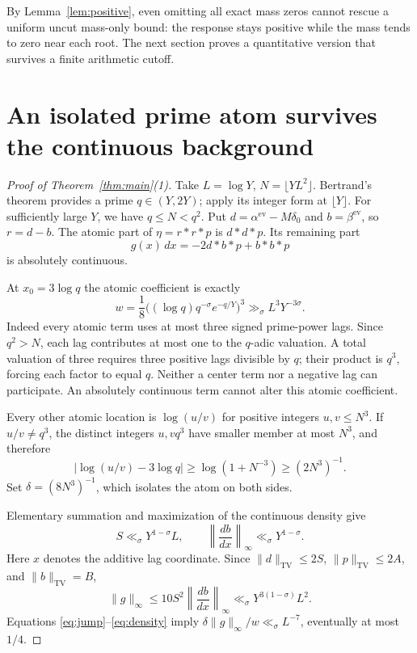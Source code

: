 \documentclass[11pt,a4paper]{article}
\theoremstyle{definition}
\theoremstyle{remark}
\newcommand{\TV}{\mathrm{TV}}
\newcommand{\ev}{\mathrm{ev}}
\newcommand{\dd}{\,d}
\begin{document}
By Lemma~\ref{lem:positive}, even omitting all exact mass zeros cannot
rescue a uniform uncut mass-only bound: the response stays positive
while the mass tends to zero near each root.
The next section proves a quantitative version that survives a
finite arithmetic cutoff.

\section{An isolated prime atom survives the continuous background}

\begin{proof}[Proof of Theorem~\ref{thm:main}(1)]
Take \(L=\log Y\), \(N=\lfloor YL^2\rfloor\).
Bertrand's theorem \cite{Erdos} provides a prime \(q\in(Y,2Y)\);
apply its integer form at \(\lfloor Y\rfloor\).
For sufficiently large \(Y\), we have \(q\le N<q^2\).
Put \(d=\alpha^\ev-M\delta_0\) and \(b=\beta^\ev\), so \(r=d-b\).
The atomic part of \(\eta=r*r*p\) is \(d*d*p\). Its remaining part
\[
 g(x)\dd x=-2d*b*p+b*b*p
\]
is absolutely continuous.

At \(x_0=3\log q\) the atomic coefficient is exactly
\begin{equation}
 w=\frac18\bigl((\log q)q^{-\sigma}e^{-q/Y}\bigr)^3
 \gg_\sigma L^3Y^{-3\sigma}.
 \label{eq:jump}
\end{equation}
Indeed every atomic term uses at most three signed prime-power
lags. Since \(q^2>N\), each lag contributes at most one to the
\(q\)-adic valuation. A total valuation of three requires three
positive lags divisible by \(q\); their product is \(q^3\), forcing
each factor to equal \(q\). Neither a center term nor a negative
lag can participate. An absolutely continuous term cannot alter
this atomic coefficient.

Every other atomic location is \(\log(u/v)\) for positive integers
\(u,v\le N^3\). If \(u/v\ne q^3\), the distinct integers \(u,vq^3\)
have smaller member at most \(N^3\), and therefore
\begin{equation}
 |\log(u/v)-3\log q|
 \ge\log(1+N^{-3})\ge(2N^3)^{-1}.
 \label{eq:spacing}
\end{equation}
Set \(\delta=(8N^3)^{-1}\), which isolates the atom on both sides.

Elementary summation and maximization of the continuous density give
\[
 S\ll_\sigma Y^{1-\sigma}L,\qquad
 \left\|\frac{db}{dx}\right\|_\infty\ll_\sigma Y^{1-\sigma}.
\]
Here \(x\) denotes the additive lag coordinate. Since
\(\|d\|_\TV\le2S\), \(\|p\|_\TV\le2A\), and \(\|b\|_\TV=B\),
\begin{equation}
 \|g\|_\infty
 \le10S^2\left\|\frac{db}{dx}\right\|_\infty
 \ll_\sigma Y^{3(1-\sigma)}L^2.
 \label{eq:density}
\end{equation}
Equations \eqref{eq:jump}--\eqref{eq:density} imply
\(\delta\|g\|_\infty/w\ll_\sigma L^{-7}\), eventually at most \(1/4\).


\end{proof}
\end{document}
